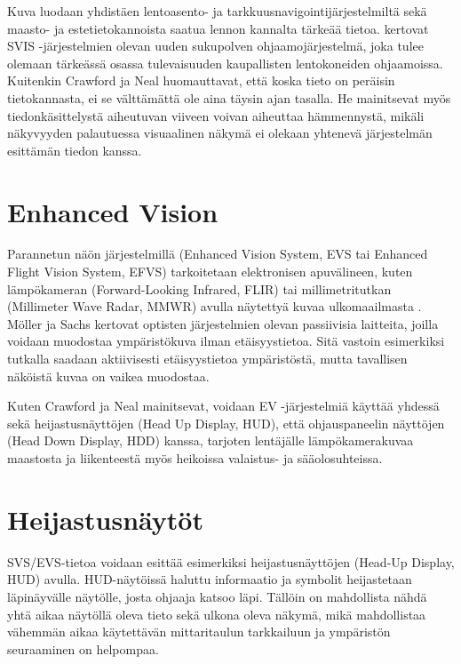 \documentclass[utf8,bachelor,manualbib]{gradu3}
\begin{document}
Kuva luodaan yhdistäen lentoasento- ja tarkkuusnavigointijärjestelmiltä sekä maasto- ja estetietokannoista saatua lennon kannalta tärkeää tietoa. \cite{schnellym2004} kertovat SVIS -järjestelmien olevan uuden sukupolven ohjaamojärjestelmä, joka tulee olemaan tärkeässä osassa tulevaisuuden kaupallisten lentokoneiden ohjaamoissa. Kuitenkin Crawford ja Neal \citeyearpar{crawfordneal2006} huomauttavat, että koska tieto on peräisin tietokannasta, ei se välttämättä ole aina täysin ajan tasalla. He mainitsevat myös tiedonkäsittelystä aiheutuvan viiveen voivan aiheuttaa hämmennystä, mikäli näkyvyyden palautuessa visuaalinen näkymä ei olekaan yhtenevä järjestelmän esittämän tiedon kanssa.

\section{Enhanced Vision}

Parannetun näön järjestelmillä (Enhanced Vision System, EVS tai Enhanced Flight Vision System, EFVS) tarkoitetaan elektronisen apuvälineen, kuten lämpökameran (Forward-Looking Infrared, FLIR) tai millimetritutkan (Millimeter Wave Radar, MMWR) avulla näytettyä kuvaa ulkomaailmasta \citep{baileyym2007}. Möller ja Sachs \citeyearpar{mollersachs1994} kertovat optisten järjestelmien olevan passiivisia laitteita, joilla voidaan muodostaa ympäristökuva ilman etäisyystietoa. Sitä vastoin esimerkiksi tutkalla saadaan aktiivisesti etäisyystietoa ympäristöstä, mutta tavallisen näköistä kuvaa on vaikea muodostaa.

Kuten Crawford ja Neal \citeyearpar{crawfordneal2006} mainitsevat, voidaan EV -järjestelmiä käyttää yhdessä sekä heijastusnäyttöjen (Head Up Display, HUD), että ohjauspaneelin näyttöjen (Head Down Display, HDD) kanssa, tarjoten lentäjälle lämpökamerakuvaa maastosta ja liikenteestä myös heikoissa valaistus- ja sääolosuhteissa.

\section{Heijastusnäytöt}

SVS/EVS-tietoa voidaan esittää esimerkiksi heijastusnäyttöjen (Head-Up Display, HUD) avulla. HUD-näytöissä haluttu informaatio ja symbolit heijastetaan läpinäyvälle näytölle, josta ohjaaja katsoo läpi. Tällöin on mahdollista nähdä yhtä aikaa näytöllä oleva tieto sekä ulkona oleva näkymä, mikä mahdollistaa vähemmän aikaa käytettävän mittaritaulun tarkkailuun ja ympäristön seuraaminen on helpompaa. \citep{crawfordneal2006}
\end{document}
